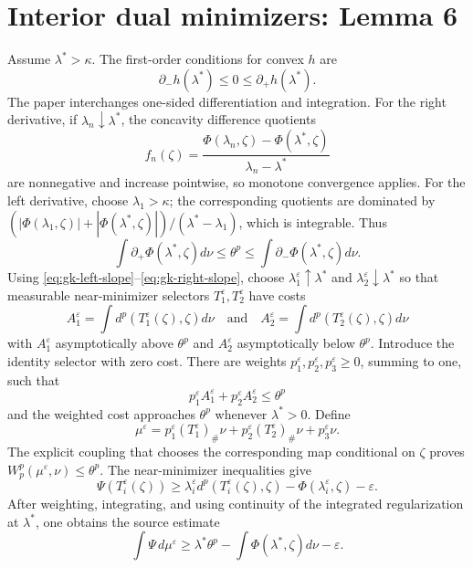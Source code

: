 \section{Interior dual minimizers: Lemma 6}
Assume \(\lambda^*>\kappa\).  The first-order conditions for convex \(h\) are
\[
 \partial_-h(\lambda^*)\le0\le\partial_+h(\lambda^*).
\]
The paper interchanges one-sided differentiation and integration.  For the right derivative, if
\(\lambda_n\downarrow\lambda^*\), the concavity difference quotients
\[
 f_n(\zeta)=\frac{\Phi(\lambda_n,\zeta)-\Phi(\lambda^*,\zeta)}
                  {\lambda_n-\lambda^*}
\]
are nonnegative and increase pointwise, so monotone convergence applies.  For the left derivative,
choose \(\lambda_1>\kappa\); the corresponding quotients are dominated by
\((|\Phi(\lambda_1,\zeta)|+|\Phi(\lambda^*,\zeta)|)/(\lambda^*-\lambda_1)\), which is integrable.
Thus
\begin{equation}\label{eq:gk-integrated-bracket}
 \int\partial_+\Phi(\lambda^*,\zeta)d\nu
 \le \theta^p
 \le \int\partial_-\Phi(\lambda^*,\zeta)d\nu.
\end{equation}
Using \eqref{eq:gk-left-slope}--\eqref{eq:gk-right-slope}, choose
\(\lambda_1^\varepsilon\uparrow\lambda^*\) and
\(\lambda_2^\varepsilon\downarrow\lambda^*\) so that measurable near-minimizer selectors
\(T_1^\varepsilon,T_2^\varepsilon\) have costs
\[
 A_1^\varepsilon=\int d^p(T_1^\varepsilon(\zeta),\zeta)d\nu
 \quad\text{and}\quad
 A_2^\varepsilon=\int d^p(T_2^\varepsilon(\zeta),\zeta)d\nu
\]
with \(A_1^\varepsilon\) asymptotically above \(\theta^p\) and
\(A_2^\varepsilon\) asymptotically below \(\theta^p\).  Introduce the identity selector with zero
cost.  There are weights \(p_1^\varepsilon,p_2^\varepsilon,p_3^\varepsilon\ge0\), summing to one,
such that
\[
 p_1^\varepsilon A_1^\varepsilon+p_2^\varepsilon A_2^\varepsilon\le\theta^p
\]
and the weighted cost approaches \(\theta^p\) whenever \(\lambda^*>0\).  Define
\begin{equation}\label{eq:gk-mueps-interior}
 \mu^\varepsilon=p_1^\varepsilon(T_1^\varepsilon)_\#\nu
                  +p_2^\varepsilon(T_2^\varepsilon)_\#\nu
                  +p_3^\varepsilon\nu.
\end{equation}
The explicit coupling that chooses the corresponding map conditional on \(\zeta\) proves
\(W_p^p(\mu^\varepsilon,\nu)\le\theta^p\).  The near-minimizer inequalities give
\[
 \Psi(T_i^\varepsilon(\zeta))
 \ge \lambda_i^\varepsilon d^p(T_i^\varepsilon(\zeta),\zeta)
      -\Phi(\lambda_i^\varepsilon,\zeta)-\varepsilon.
\]
After weighting, integrating, and using continuity of the integrated regularization at
\(\lambda^*\), one obtains the source estimate
\begin{equation}\label{eq:gk-interior-eps}
 \int\Psi\,d\mu^\varepsilon
 \ge \lambda^*\theta^p-
       \int\Phi(\lambda^*,\zeta)d\nu-\varepsilon.
\end{equation}

